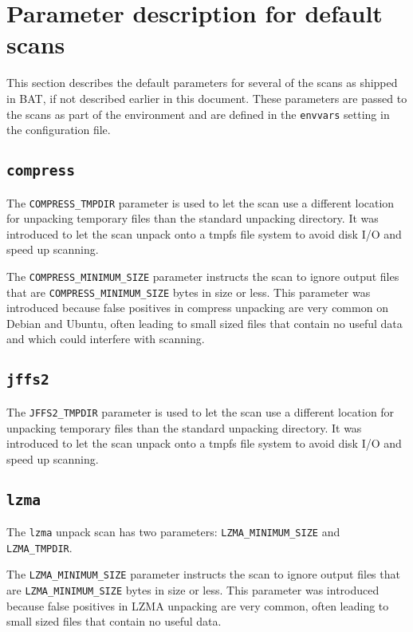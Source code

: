 \documentclass[10pt,a4paper]{article}
\begin{document}
\section{Parameter description for default scans}

This section describes the default parameters for several of the scans as
shipped in BAT, if not described earlier in this document. These parameters are
passed to the scans as part of the environment and are defined in the
\texttt{envvars} setting in the configuration file.

\subsection{\texttt{compress}}

The \texttt{COMPRESS\_TMPDIR} parameter is used to let the scan use a different
location for unpacking temporary files than the standard unpacking directory.
It was introduced to let the scan unpack onto a tmpfs file system to avoid disk
I/O and speed up scanning.

The \texttt{COMPRESS\_MINIMUM\_SIZE} parameter instructs the scan to ignore
output files that are \texttt{COMPRESS\_MINIMUM\_SIZE} bytes in size or less.
This parameter was introduced because false positives in compress unpacking are
very common on Debian and Ubuntu, often leading to small sized files that
contain no useful data and which could interfere with scanning.

\subsection{\texttt{jffs2}}

The \texttt{JFFS2\_TMPDIR} parameter is used to let the scan use a different
location for unpacking temporary files than the standard unpacking directory.
It was introduced to let the scan unpack onto a tmpfs file system to avoid disk
I/O and speed up scanning.

\subsection{\texttt{lzma}}

The \texttt{lzma} unpack scan has two parameters: \texttt{LZMA\_MINIMUM\_SIZE}
and \texttt{LZMA\_TMPDIR}.

The \texttt{LZMA\_MINIMUM\_SIZE} parameter instructs the scan to ignore output
files that are \texttt{LZMA\_MINIMUM\_SIZE} bytes in size or less. This
parameter was introduced because false positives in LZMA unpacking are very
common, often leading to small sized files that contain no useful data.
\end{document}
